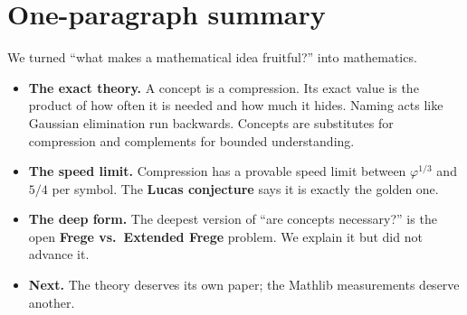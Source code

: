 \documentclass[11pt]{article}
\begin{document}
\section{One-paragraph summary}

We turned ``what makes a mathematical idea fruitful?'' into mathematics.
\begin{itemize}
\item \textbf{The exact theory.} A concept is a compression. Its exact value is the
  product of how often it is needed and how much it hides. Naming acts like Gaussian
  elimination run backwards. Concepts are substitutes for compression and complements for
  bounded understanding.
\item \textbf{The speed limit.} Compression has a provable speed limit between
  $\varphi^{1/3}$ and $5/4$ per symbol. The \textbf{Lucas conjecture} says it is exactly
  the golden one.
\item \textbf{The deep form.} The deepest version of ``are concepts necessary?'' is the
  open \textbf{Frege vs.\ Extended Frege} problem. We explain it but did not advance it.
\item \textbf{Next.} The theory deserves its own paper; the Mathlib measurements deserve
  another.
\end{itemize}
\end{document}
